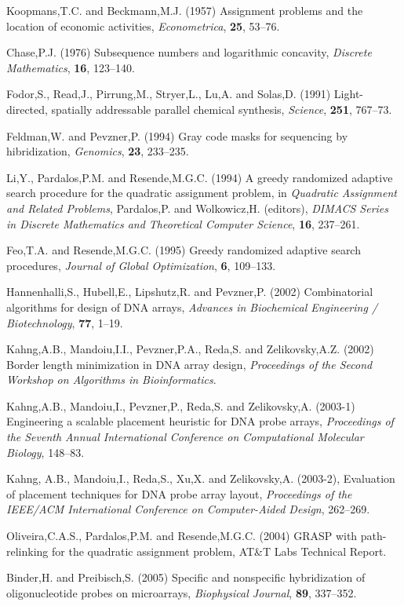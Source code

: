 \documentclass{bioinfo}
\begin{document}
\begin{thebibliography}{}

 Koopmans,T.C. and Beckmann,M.J. (1957) Assignment problems and the location of economic activities, {\it Econometrica}, {\bf 25}, 53--76.

 Chase,P.J. (1976) Subsequence numbers and logarithmic concavity, {\it Discrete Mathematics}, {\bf 16}, 123--140.

 Fodor,S., Read,J., Pirrung,M., Stryer,L., Lu,A. and Solas,D. (1991) Light-directed, spatially addressable parallel chemical synthesis, {\it Science}, {\bf 251}, 767--73.

 Feldman,W. and Pevzner,P. (1994) Gray code masks for sequencing by hibridization, {\it Genomics}, {\bf 23}, 233--235.

 Li,Y., Pardalos,P.M. and Resende,M.G.C. (1994) A greedy randomized adaptive search procedure for the quadratic assignment problem, in {\it Quadratic Assignment and Related Problems}, Pardalos,P. and Wolkowicz,H. (editors), {\it DIMACS Series in Discrete Mathematics and Theoretical Computer Science}, {\bf 16}, 237--261.

 Feo,T.A. and Resende,M.G.C. (1995) Greedy randomized adaptive search procedures, {\it Journal of Global Optimization}, {\bf 6}, 109--133.

 Hannenhalli,S., Hubell,E., Lipshutz,R. and Pevzner,P. (2002) Combinatorial algorithms for design of DNA arrays, {\it Advances in Biochemical Engineering / Biotechnology}, {\bf 77}, 1--19.

 Kahng,A.B., Mandoiu,I.I., Pevzner,P.A., Reda,S. and Zelikovsky,A.Z. (2002) Border length minimization in DNA array design, {\it Proceedings of the Second Workshop on Algorithms in Bioinformatics}.

 Kahng,A.B., Mandoiu,I., Pevzner,P., Reda,S. and Zelikovsky,A. (2003-1) Engineering a scalable placement heuristic for DNA probe arrays, {\it Proceedings of the Seventh Annual International Conference on Computational Molecular Biology}, 148--83.

 Kahng, A.B., Mandoiu,I., Reda,S., Xu,X. and Zelikovsky,A. (2003-2), Evaluation of placement techniques for DNA probe array layout, {\it Proceedings of the IEEE/ACM International Conference on Computer-Aided Design}, 262--269.

 Oliveira,C.A.S., Pardalos,P.M. and Resende,M.G.C. (2004) GRASP with path-relinking for the quadratic assignment problem, AT\&T Labs Technical Report.

 Binder,H. and Preibisch,S. (2005) Specific and nonspecific hybridization of oligonucleotide probes on microarrays, {\it Biophysical Journal}, {\bf 89}, 337--352.

\end{thebibliography}
\end{document}
